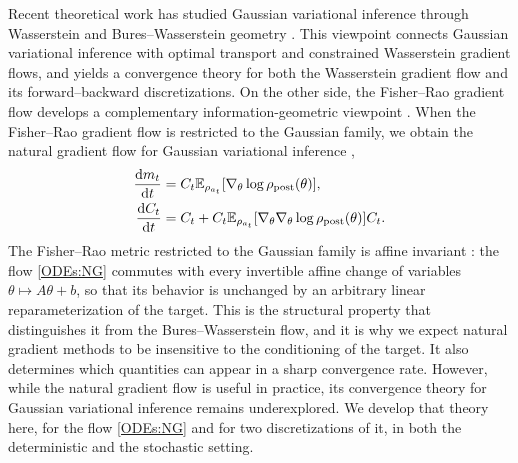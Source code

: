 Recent theoretical work has studied Gaussian variational inference through
Wasserstein and Bures--Wasserstein geometry
\cite{lambert2022variational, diao2023forward}. This viewpoint connects Gaussian
variational inference with optimal transport and constrained Wasserstein
gradient flows, and yields a convergence theory for both the Wasserstein
gradient flow and its forward--backward discretizations. On the other side,
the Fisher--Rao gradient flow \cite{carrillo2026fisher} develops a complementary
information-geometric viewpoint \cite{amari2016information}. When the
Fisher--Rao gradient flow is restricted to the Gaussian family, we obtain the
natural gradient flow \cite{amari1998natural} for Gaussian variational
inference \cite{chen2023sampling},
\begin{equation}\label{ODEs:NG}
    \begin{aligned}
        \frac{\mathrm{d} m_t}{\mathrm{d} t} &= C_t\mathbb{E}_{\rho_{a_t}}[\nabla_\theta \log \rho_{\mathrm{post}}(\theta)], \\
        \frac{\mathrm{d} C_t}{\mathrm{d} t} &= C_t + C_t \mathbb{E}_{\rho_{a_t}}[\nabla_\theta \nabla_\theta \log \rho_{\mathrm{post}}(\theta)] C_t.
    \end{aligned}
\end{equation}
The Fisher--Rao metric restricted to the Gaussian family is affine invariant
\cite{chen2023sampling}: the flow \eqref{ODEs:NG} commutes with every invertible
affine change of variables $\theta \mapsto A\theta + b$, so that its behavior is
unchanged by an arbitrary linear reparameterization of the target. This is the
structural property that distinguishes it from the Bures--Wasserstein flow, and
it is why we expect natural gradient methods to be insensitive to the
conditioning of the target. It also determines which quantities can appear in a
sharp convergence rate. However,
while the natural gradient flow is useful in practice, its convergence theory
for Gaussian variational inference remains underexplored. We develop that theory
here, for the flow \eqref{ODEs:NG} and for two discretizations of it, in both
the deterministic and the stochastic setting.

